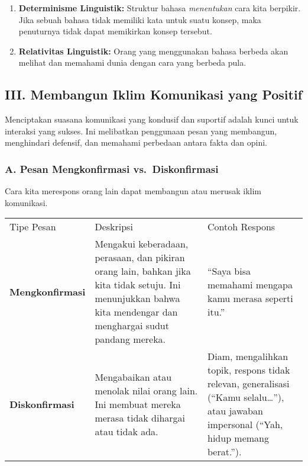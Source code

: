 \documentclass[
  letterpaper,
  DIV=11,
  numbers=noendperiod]{scrreprt}
\begin{document}
\begin{enumerate}
\def\labelenumi{\arabic{enumi}.}
\item
  \textbf{Determinisme Linguistik:} Struktur bahasa \emph{menentukan}
  cara kita berpikir. Jika sebuah bahasa tidak memiliki kata untuk suatu
  konsep, maka penuturnya tidak dapat memikirkan konsep tersebut.
\item
  \textbf{Relativitas Linguistik:} Orang yang menggunakan bahasa berbeda
  akan melihat dan memahami dunia dengan cara yang berbeda pula.
\end{enumerate}

\subsection{III. Membangun Iklim Komunikasi yang
Positif}\label{iii.-membangun-iklim-komunikasi-yang-positif}

Menciptakan suasana komunikasi yang kondusif dan suportif adalah kunci
untuk interaksi yang sukses. Ini melibatkan penggunaan pesan yang
membangun, menghindari defensif, dan memahami perbedaan antara fakta dan
opini.

\subsubsection{A. Pesan Mengkonfirmasi
vs.~Diskonfirmasi}\label{a.-pesan-mengkonfirmasi-vs.-diskonfirmasi}

Cara kita merespons orang lain dapat membangun atau merusak iklim
komunikasi.

\begin{longtable}[]{@{}
  >{\raggedright\arraybackslash}p{}
  >{\raggedright\arraybackslash}p{}
  >{\raggedright\arraybackslash}p{}@{}}
\toprule\noalign{}
\endhead
\bottomrule\noalign{}
\endlastfoot
Tipe Pesan & Deskripsi & Contoh Respons \\
\textbf{Mengkonfirmasi} & Mengakui keberadaan, perasaan, dan pikiran
orang lain, bahkan jika kita tidak setuju. Ini menunjukkan bahwa kita
mendengar dan menghargai sudut pandang mereka. & ``Saya bisa memahami
mengapa kamu merasa seperti itu.'' \\
\textbf{Diskonfirmasi} & Mengabaikan atau menolak nilai orang lain. Ini
membuat mereka merasa tidak dihargai atau tidak ada. & Diam, mengalihkan
topik, respons tidak relevan, generalisasi (``Kamu selalu\ldots{}''),
atau jawaban impersonal (``Yah, hidup memang berat.''). \\
\end{longtable}
\end{document}
